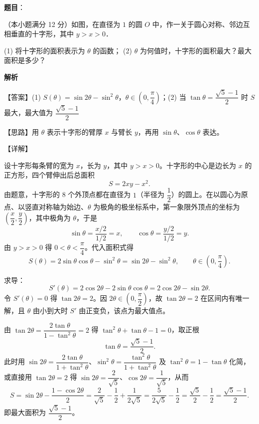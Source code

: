 \begin{answer}

\textbf{题目}：

（本小题满分 12 分）如图，在直径为 $1$ 的圆 $O$ 中，作一关于圆心对称、邻边互相垂直的十字形，其中 $y > x > 0$．
\nopagebreak[4]
\begin{center}\end{center}
\nopagebreak[4]
(1) 将十字形的面积表示为 $\theta$ 的函数；
(2) $\theta$ 为何值时，十字形的面积最大？最大面积是多少？

\textbf{解析}

【答案】(1) $S(\theta) = \sin 2\theta - \sin^2\theta$，$\theta \in \left(0, \dfrac{\pi}{4}\right)$；(2) 当 $\tan\theta = \dfrac{\sqrt{5}-1}{2}$ 时 $S$ 最大，最大值为 $\dfrac{\sqrt{5}-1}{2}$

【思路】用 $\theta$ 表示十字形的臂厚 $x$ 与臂长 $y$，再用 $\sin\theta$、$\cos\theta$ 表达。

【详解】


设十字形每条臂的宽为 $x$，长为 $y$，其中 $y > x > 0$。十字形的中心是边长为 $x$ 的正方形，四个臂伸出后总面积
\nopagebreak[4]
\[
S = 2xy - x^2.
\]
由题意，十字形的 8 个外顶点都在直径为 $1$（半径为 $\dfrac{1}{2}$）的圆上。在以圆心为原点、以竖直对称轴为始边、$\theta$ 为极角的极坐标系中，第一象限外顶点的坐标为 $\left(\dfrac{x}{2}, \dfrac{y}{2}\right)$，其中极角为 $\theta$，于是
\nopagebreak[4]
\[
\sin\theta = \frac{x/2}{1/2} = x,\qquad \cos\theta = \frac{y/2}{1/2} = y.
\]
由 $y > x > 0$ 得 $0 < \theta < \dfrac{\pi}{4}$。代入面积式得
\nopagebreak[4]
\[
S(\theta) = 2\sin\theta\cos\theta - \sin^2\theta = \sin 2\theta - \sin^2\theta,\qquad \theta \in \left(0, \frac{\pi}{4}\right).
\]


求导：
\nopagebreak[4]
\[
S'(\theta) = 2\cos 2\theta - 2\sin\theta\cos\theta = 2\cos 2\theta - \sin 2\theta.
\]
令 $S'(\theta) = 0$ 得 $\tan 2\theta = 2$。因 $2\theta \in \left(0, \dfrac{\pi}{2}\right)$，故 $\tan 2\theta = 2$ 在区间内有唯一解，且 $\theta$ 由小到大时 $S'$ 由正变负，该点为最大值点。

由 $\tan 2\theta = \dfrac{2\tan\theta}{1-\tan^2\theta} = 2$ 得 $\tan^2\theta + \tan\theta - 1 = 0$，取正根
\nopagebreak[4]
\[
\tan\theta = \frac{\sqrt{5}-1}{2}.
\]
此时用 $\sin 2\theta = \dfrac{2\tan\theta}{1+\tan^2\theta}$、$\sin^2\theta = \dfrac{\tan^2\theta}{1+\tan^2\theta}$ 及 $\tan^2\theta = 1 - \tan\theta$ 化简，或直接用 $\tan 2\theta = 2$ 得 $\sin 2\theta = \dfrac{2}{\sqrt{5}}$、$\cos 2\theta = \dfrac{1}{\sqrt{5}}$，从而
\nopagebreak[4]
\[
S = \sin 2\theta - \frac{1 - \cos 2\theta}{2} = \frac{2}{\sqrt{5}} - \frac{1}{2} + \frac{1}{2\sqrt{5}} = \frac{5}{2\sqrt{5}} - \frac{1}{2} = \frac{\sqrt{5}}{2} - \frac{1}{2} = \frac{\sqrt{5}-1}{2}.
\]
即最大面积为 $\dfrac{\sqrt{5}-1}{2}$。


\end{answer}

